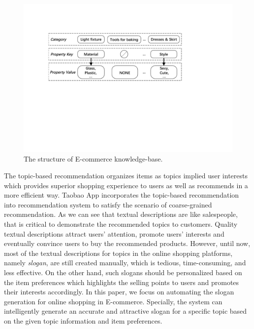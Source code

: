 \begin{figure}[th!]
	\centering
	\includegraphics[width=0.95\columnwidth]{figures/cpv2}
	\caption{The structure of E-commerce knowledge-base.}
	\label{fig:cpv}
\end{figure}

The topic-based recommendation organizes items as topics implied user interests 
which provides superior shopping experience to users as well as recommends in a more efficient way.
Taobao App incorporates the topic-based recommendation 
into recommendation system to satisfy the scenario of coarse-grained recommendation.
As we can see that textual descriptions are like salespeople,
that is critical to demonstrate the recommended topics to customers.
Quality textual descriptions attract users' attention, promote users' interests and eventually convince users to buy the recommended products.
However, until now, most of the textual descriptions for topics in the online shopping platforms,
namely \emph{slogan},
are still created manually, 
which is tedious, time-consuming, and less effective.
On the other hand, such slogans should be personalized based on the item preferences
which highlights the selling points to users
and promotes their interests accordingly.
In this paper, we focus on automating the slogan generation
for online shopping in E-commerce.
Specially, the system can intelligently generate an accurate and
attractive slogan for a specific topic based on the given topic information and item preferences.


